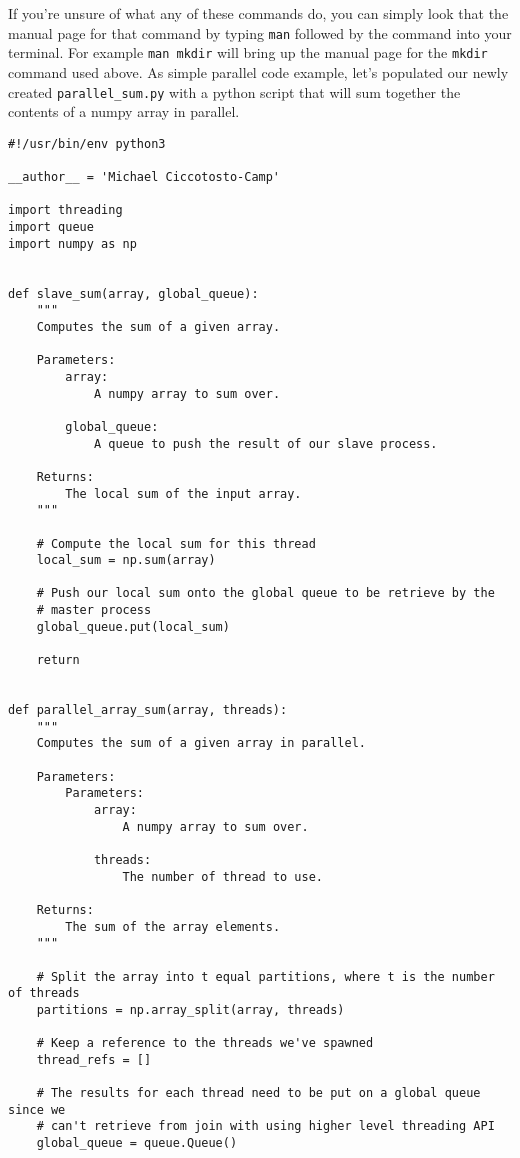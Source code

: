 If you're unsure of what any of these commands do, you can simply look that the manual page for that command by typing \texttt{man} followed by the command into your terminal. For example \texttt{man mkdir} will bring up the manual page for the \texttt{mkdir} command used above. As simple parallel code example, let's populated our newly created \texttt{parallel\_sum.py} with a python script that will sum together the contents of a numpy array in parallel.
\begin{verbatim}
#!/usr/bin/env python3

__author__ = 'Michael Ciccotosto-Camp'

import threading
import queue
import numpy as np


def slave_sum(array, global_queue):
    """
    Computes the sum of a given array.

    Parameters:
        array:
            A numpy array to sum over.

        global_queue:
            A queue to push the result of our slave process.

    Returns:
        The local sum of the input array.
    """

    # Compute the local sum for this thread
    local_sum = np.sum(array)

    # Push our local sum onto the global queue to be retrieve by the
    # master process
    global_queue.put(local_sum)

    return


def parallel_array_sum(array, threads):
    """
    Computes the sum of a given array in parallel.

    Parameters:
        Parameters:
            array:
                A numpy array to sum over.

            threads:
                The number of thread to use.

    Returns:
        The sum of the array elements.
    """

    # Split the array into t equal partitions, where t is the number of threads
    partitions = np.array_split(array, threads)

    # Keep a reference to the threads we've spawned
    thread_refs = []

    # The results for each thread need to be put on a global queue since we
    # can't retrieve from join with using higher level threading API
    global_queue = queue.Queue()


\end{verbatim}
